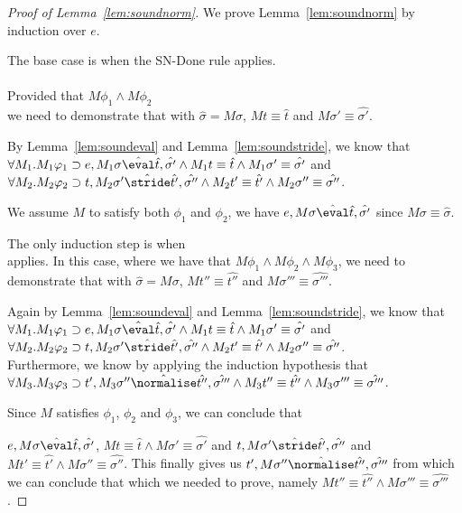 \begin{proof}[Proof of Lemma~\ref{lem:soundnorm}]
  We prove Lemma~\ref{lem:soundnorm} by induction over $e$.

  The base case is when the SN-Done rule applies.\\
  \\

  Provided that $M\phi_1\land M\phi_2$\\
  we need to demonstrate that
   with $\hat{\sigma}=M\sigma$,
  $M t\equiv \hat{t}$ and $M\sigma'\equiv \hat{\sigma'}$.

  By Lemma~\ref{lem:soundeval} and Lemma~\ref{lem:soundstride}, we know that\\
  $\forall M_1. M_1\phi_1 \implies e,M_1\sigma \hat{\eval}\hat{t},\hat{\sigma'}\land M_1 t \equiv \hat{t} \land M_1 \sigma'\equiv \hat{\sigma'}$ and\\
  $\forall M_2.M_2\phi_2\implies t,M_2\sigma'\hat{\stride}\hat{t'},\hat{\sigma''}\land M_2 t'\equiv\hat{t'}\land M_2\sigma''\equiv \hat{\sigma''}$.

  We assume $M$ to satisfy both $\phi_1$ and $\phi_2$, we have $e,M\sigma \hat{\eval}\hat{t},\hat{\sigma'}$ since $M\sigma\equiv \hat{\sigma}$.

  The only induction step is when\\
   applies.
  In this case, where we have that $M\phi_1\land M\phi_2 \land M\phi_3$,
  we need to demonstrate that
   with $\hat{\sigma}=M\sigma$,
  $M t''\equiv \hat{t''}$ and $M\sigma'''\equiv \hat{\sigma'''}$.

  Again by Lemma~\ref{lem:soundeval} and Lemma~\ref{lem:soundstride}, we know that\\
  $\forall M_1. M_1\phi_1 \implies e,M_1\sigma \hat{\eval}\hat{t},\hat{\sigma'}\land M_1 t \equiv \hat{t} \land M_1 \sigma'\equiv \hat{\sigma'}$ and\\
  $\forall M_2.M_2\phi_2\implies t,M_2\sigma'\hat{\stride}\hat{t'},\hat{\sigma''}\land M_2 t'\equiv\hat{t'}\land M_2\sigma''\equiv \hat{\sigma''}$.\\
  Furthermore, we know by applying the induction hypothesis that $\forall M_3.M_3\phi_3 \implies t',M_3\sigma''\hat{\normalise} \hat{t''},\hat{\sigma'''}\land M_3 t''\equiv \hat{t''}\land M_3 \sigma'''\equiv \hat{\sigma'''}$.

  Since $M$ satisfies $\phi_1$, $\phi_2$ and $\phi_3$,
  we can conclude that

  $e,M\sigma \hat{\eval}\hat{t},\hat{\sigma'}$, $M t \equiv \hat{t} \land M \sigma'\equiv \hat{\sigma'}$ and $t,M\sigma'\hat{\stride}\hat{t'},\hat{\sigma''}$ and $M t'\equiv\hat{t'}\land M\sigma''\equiv \hat{\sigma''}$.
  This finally gives us $t',M\sigma''\hat{\normalise} \hat{t''},\hat{\sigma'''}$ from which we can conclude that which we needed to prove,
  namely $M t''\equiv \hat{t''}\land M\sigma'''\equiv \hat{\sigma'''}$.
\end{proof}



